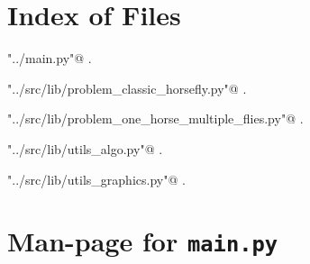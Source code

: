 \documentclass[11.5pt]{report}
\begin{document}
\newpage

\begin{appendices}
\chapter{Index of Files}

{\small\begin{list}{}{\setlength{\itemsep}{-\parsep}\setlength{\itemindent}{-\leftmargin}}
\item \verb@"../main.py"@ {\footnotesize {\NWtxtDefBy} .}
\item \verb@"../src/lib/problem_classic_horsefly.py"@ {\footnotesize {\NWtxtDefBy} .}
\item \verb@"../src/lib/problem_one_horse_multiple_flies.py"@ {\footnotesize {\NWtxtDefBy} .}
\item \verb@"../src/lib/utils_algo.py"@ {\footnotesize {\NWtxtDefBy} .
}
\item \verb@"../src/lib/utils_graphics.py"@ {\footnotesize {\NWtxtDefBy} .
}
\end{list}}
\chapter{Man-page for \texttt{main.py}}


\end{appendices}
\end{document}
